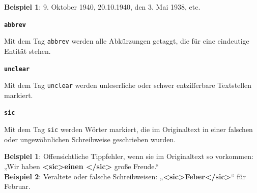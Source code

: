 \documentclass[12pt, a4paper, ngerman, bidi=default]{article}
\begin{document}
\begin{description}
    \noindent \textbf{ Beispiel 1}: 9. Oktober 1940, 20.10.1940, den 3. Mai 1938, etc.\\
    
    \item \textbf{\colorbox{abbrev}{\texttt{abbrev}}}
        
    Mit dem Tag \texttt{\colorbox{abbrev}{abbrev}} werden alle Abkürzungen getaggt, die für eine eindeutige Entität stehen.  
    
    \item \textbf{\colorbox{unclear}{\texttt{unclear}}}
    
    Mit dem Tag \texttt{\colorbox{unclear}{unclear}} werden unleserliche oder schwer entzifferbare Textstellen markiert.  
    
    \item \textbf{\colorbox{sic}{\texttt{sic}}} 
    
    Mit dem Tag \texttt{sic} werden Wörter markiert, die im Originaltext in einer falschen oder ungewöhnlichen Schreibweise geschrieben wurden.  
    
    \noindent\textbf{ Beispiel 1}: Offensichtliche Tippfehler, wenn sie im Originaltext so vorkommen:  
    „Wir haben \textbf{\textless sic\textgreater einen \textless /sic\textgreater} große Freude.“\\
    
    \textbf{ Beispiel 2}: Veraltete oder falsche Schreibweisen:  
    „\textbf{\textless sic\textgreater Feber\textless /sic\textgreater}“ für Februar.\\
    
    \end{description}
    
\end{document}
